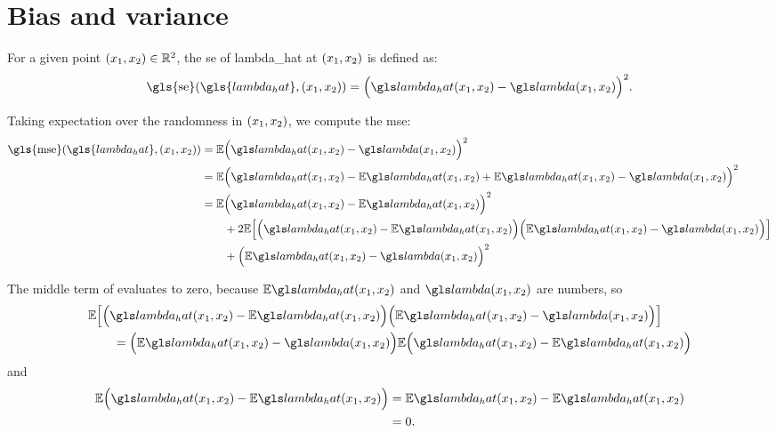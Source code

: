 

\section{Bias and variance }
\label{sec:derivations:biasvariance}

For a given point $(x_1, x_2) \in \mathbb{R}^2$,
the \gls{se} of \gls{lambda_hat} at $(x_1, x_2)$ is defined as:
\begin{equation}
    \mbox{\gls{se}}(\gls{lambda_hat}, \xvec) = \Big(\lmbdhat - \lmbd \Big)^2 \text{.}
\end{equation}

Taking expectation over the randomness in $(x_1, x_2)$, we compute the \gls{mse}:
\begin{align}
    \mbox{\gls{mse}}(\gls{lambda_hat}, \xvec)
        & = \E \Big(\lmbdhat - \lmbd \Big)^2 \nonumber \\
        & = \E \Big(\lmbdhat - \E\lmbdhat + \E\lmbdhat - \lmbd \Big)^2 \nonumber \\
        & = \E \Big( \lmbdhat - \E\lmbdhat \Big)^2 \nonumber \\
        &    \qquad + 2 \E \Big[ \Big( \lmbdhat - \E\lmbdhat \Big) \Big( \E\lmbdhat - \lmbd \Big) \Big] \nonumber \\
        &    \qquad + \Big( \E\lmbdhat - \lmbd \Big)^2 \label{eq:mse:expanded}
\end{align}

The middle term of  evaluates to zero,
because $\E\lmbdhat$ and $\lmbd$ are numbers,
so
\begin{equation*}\begin{split}
    & \E \Big[ \Big( \lmbdhat - \E\lmbdhat \Big) \Big( \E\lmbdhat - \lmbd \Big) \Big] \\
    &    \qquad = \Big( \E\lmbdhat - \lmbd \Big) \E \Big( \lmbdhat - \E\lmbdhat \Big)
\end{split}\end{equation*}
and
\begin{equation*}\begin{split}
    \E \Big( \lmbdhat - \E\lmbdhat \Big) \nonumber & = \E \lmbdhat - \E\lmbdhat \\
        & = 0 \text{.}
\end{split}\end{equation*}

